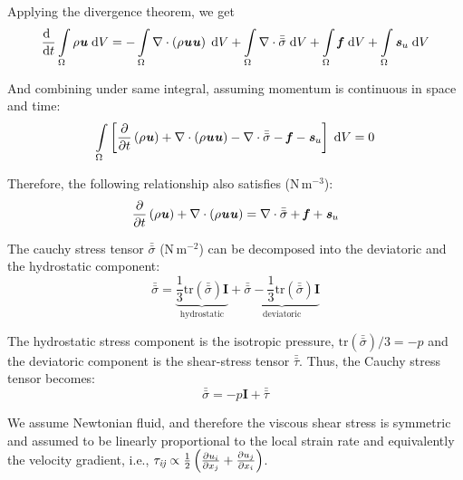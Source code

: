 Applying the divergence theorem, we get
\begin{equation}
\frac{\mathrm{d}~}{{\mathrm{d}t}} \int \limits_\Omega  {\rho }{{\textbf{\textit{u}}}}\;\mathrm{d}V =  - \int \limits_{\Omega}  \nabla \cdot \left(\rho \textbf{\textit{u}} \textbf{\textit{u}} \right)\; \mathrm{d}V +  \int \limits_\Omega \nabla \cdot \bar{\bar{{\sigma}}}\;\mathrm{d}V + \int \limits_\Omega \textbf{\textit{f}}\; \mathrm{d}V + \int \limits_\Omega \textbf{\textit{s}}_{u}\; \mathrm{d}V
\end{equation}

And combining under same integral, assuming momentum is continuous in space and time:
\begin{equation}
\int \limits_\Omega \left[ \frac{\partial}{\partial t} \left(\rho \textbf{\textit{u}} \right) + \nabla \cdot \left(\rho \textbf{\textit{u}}\textbf{\textit{u}} \right) - \nabla \cdot \bar{\bar{{\sigma}}} - \textbf{\textit{f}} -  \textbf{\textit{s}}_{u} \right]\; \mathrm{d}V = 0
\end{equation}

Therefore, the following relationship also satisfies (N\,m$^{-3}$):
\begin{equation}
\frac{\partial}{\partial t} \left(\rho \textbf{\textit{u}} \right) + \nabla \cdot \left(\rho \textbf{\textit{u}}\textbf{\textit{u}} \right) = \nabla \cdot \bar{\bar{{\sigma}}} +  \textbf{\textit{f}} +  \textbf{\textit{s}}_{u}
\end{equation}

The cauchy stress tensor $\bar{\bar{{\sigma}}}$ (N\,m$^{-2}$) can be decomposed into the deviatoric and the hydrostatic component:
\begin{equation}
\bar{\bar{{\sigma}}} =  \underbrace{ \frac{1}{3}\mathrm{tr}\left(\bar{\bar{{\sigma}}}\right) \textbf{I} }_\text{hydrostatic}  + \underbrace{ \bar{\bar{{\sigma}}} - \frac{1}{3}\mathrm{tr}\left(\bar{\bar{{\sigma}}} \right)\textbf{I} }_\text{deviatoric}
\end{equation}

The hydrostatic stress component is the isotropic pressure, $\mathrm{tr}\left(\bar{\bar{{\sigma}}} \right)/3 = -p$ and the deviatoric component is the shear-stress tensor $\bar{\bar{{\tau}}}$. Thus, the Cauchy stress tensor becomes:
\begin{equation}
\bar{\bar{\sigma}} = -p\textbf{I} + \bar{\bar{{\tau}}}
\end{equation}

\begin{assumption}
	We assume Newtonian fluid, and therefore the viscous shear stress is symmetric and assumed to be linearly proportional to the local strain rate and equivalently the velocity gradient, i.e., $\tau_{\textit{ij}} \propto \frac{1}{2}\left(\frac{\partial u_i}{\partial x_j} + \frac{\partial u_j}{\partial x_i}\right)$.
\end{assumption}

